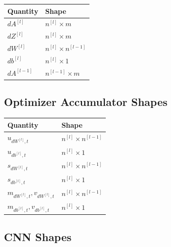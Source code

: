 \begin{center}
\begin{tabular}{ll}
\toprule
Quantity & Shape \\
\midrule
$dA^{[l]}$ & $n^{[l]} \times m$ \\
$dZ^{[l]}$ & $n^{[l]} \times m$ \\
$dW^{[l]}$ & $n^{[l]} \times n^{[l-1]}$ \\
$db^{[l]}$ & $n^{[l]} \times 1$ \\
$dA^{[l-1]}$ & $n^{[l-1]} \times m$ \\
\bottomrule
\end{tabular}
\end{center}

\subsection{Optimizer Accumulator Shapes}

\begin{center}
\begin{tabular}{ll}
\toprule
Quantity & Shape \\
\midrule
$u_{dW^{[l]},t}$ & $n^{[l]} \times n^{[l-1]}$ \\
$u_{db^{[l]},t}$ & $n^{[l]} \times 1$ \\
$s_{dW^{[l]},t}$ & $n^{[l]} \times n^{[l-1]}$ \\
$s_{db^{[l]},t}$ & $n^{[l]} \times 1$ \\
$m_{dW^{[l]},t},v_{dW^{[l]},t}$ & $n^{[l]} \times n^{[l-1]}$ \\
$m_{db^{[l]},t},v_{db^{[l]},t}$ & $n^{[l]} \times 1$ \\
\bottomrule
\end{tabular}
\end{center}

\subsection{CNN Shapes}

